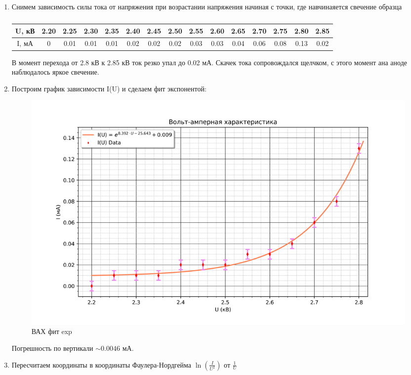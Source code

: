 \documentclass[a4paper]{article}
\begin{document}
\begin{enumerate}
	\item Снимем зависимость силы тока от напряжения при возрастании напряжения 
	начиная с точки, где навчинаяется свечение образца
	\begin{table}[H]
        \centering
        \caption{}
        \label{t1}
        \begin{tabular}{|c||c|c|c|c|c|c|c|c|c|c|c|c|c|c|}
            \hline
			U, кВ&2.20&2.25&2.30&2.35&2.40&2.45&2.50&2.55&2.60&2.65&2.70&2.75&2.80&2.85 \\ \hline
			I, мА&0&0.01&0.01&0.01&0.02&0.02&0.02&0.03&0.03&0.04&0.06&0.08&0.13&0.02 \\ \hline
        \end{tabular}
    \end{table}

	В момент перехода от 2.8 кВ к 2.85 кВ ток резко упал до 0.02 мА. Скачек тока 
	сопровождался щелчком, с этого момент ана аноде наблюдалось яркое свечение.

	\item Построим график зависимости I(U) и сделаем фит экспонентой:

	\begin{figure}[H]
		\begin{center}
		\includegraphics[scale = 0.5]{I(U).png}
		\caption{ВАХ фит exp}
		\label{default}
		\end{center}
	\end{figure}

	Погрешность по вертикали $\sim 0.0046$ мА.
	
	\item Пересчитаем координаты в координаты Фаулера-Нордгейма $\ln{\left( \frac{I}{U^2} \right)}$
	от $\frac{1}{U}$


\end{enumerate}
\end{document}
